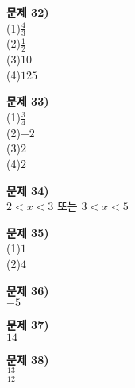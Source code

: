 \documentclass{oblivoir}
\newcommand\an[1]{\par\bigskip\noindent\textbf{문제 #1)}\\}
\begin{document}
\begin{minipage}{0.33\textwidth}

%
\an{32}
\noindent
(1)\:\:\(\frac43\)\\
(2)\:\:\(\frac12\)\\
(3)\:\:\(10\)\\
(4)\:\:\(125\)

%
\an{33}
\noindent
(1)\:\:\(\frac34\)\\
(2)\:\:\(-2\)\\
(3)\:\:\(2\)\\
(4)\:\:\(2\)

%
\an{34}
\noindent
\(2< x< 3\) 또는 \(3< x< 5\)

%
\an{35}
\noindent
(1)\:\:\(1\)\\
(2)\:\:\(4\)

%
\an{36}
\noindent
\(-5\)

%
\an{37}
\noindent
\(14\)

%
\an{38}
\noindent
\(\frac{13}{12}\)

\end{minipage}
\end{document}
